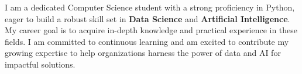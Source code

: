 \par{

I am a dedicated Computer Science student with a strong proficiency in Python, eager to build a robust skill set in \textbf{Data Science} and \textbf{Artificial Intelligence}. My career goal is to acquire in-depth knowledge and practical experience in these fields. I am committed to continuous learning and am excited to contribute my growing expertise to help organizations harness the power of data and AI for impactful solutions.


}